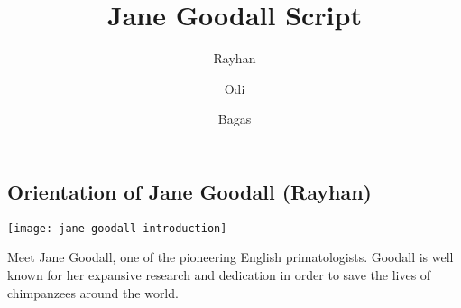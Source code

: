 \documentclass[12pt]{report}
\title{Jane Goodall Script}
\author{Rayhan \and Odi \and Bagas}
\begin{document}
\maketitle

\centering

\subsection*{Orientation of Jane Goodall (Rayhan)}

\texttt{[image: jane-goodall-introduction]}

Meet Jane Goodall, one of the pioneering English primatologists. Goodall is
well known for her expansive research and dedication in order to save the lives
of chimpanzees around the world.
\end{document}
